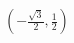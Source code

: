 \documentclass[preview]{standalone}
\begin{document}
\begin{align*}
\left(-\frac{\sqrt{3}}{2}, \frac{1}{2}\right)
\end{align*}
\end{document}
